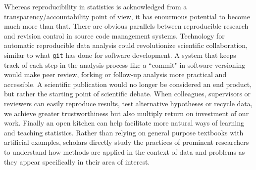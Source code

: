 Whereas reproducibility in statistics is acknowledged from a transparency/accountability point of view, it has enourmous potential to become much more than that. There are obvious parallels between reproducible research and revision control in source code management systems. Technology for automatic reproducible data analysis could revolutionize scientific collaboration, similar to what \texttt{git} has done for software development. A system that keeps track of each step in the  analysis process like a ``commit" in software versioning would make peer review, forking or follow-up analysis more practical and accessible. A scientific publication would no longer be considered an end product, but rather the starting point of scientific debate. When colleagues, supervisors or reviewers can easily reproduce results, test alternative hypotheses or recycle data, we achieve greater trustworthiness but also multiply return on investment of our work. Finally an open kitchen can help facilitate more natural ways of learning and teaching statistics. Rather than relying on general purpose textbooks with artificial examples, scholars directly study the practices of prominent researchers to understand how methods are applied in the context of data and problems as they appear specifically in their area of interest.